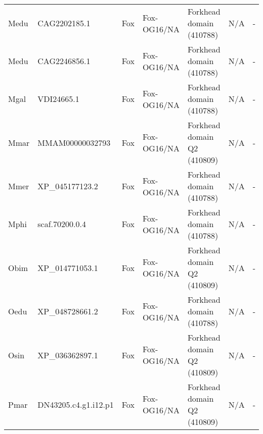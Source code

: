 \documentclass[../main.tex]{subfiles}
\begin{document}
\begin{landscape}
\begin{longtable}{lllllll}
		Medu           & CAG2202185.1          & Fox            & Fox-OG16/NA         & Forkhead domain (410788)                    & N/A                                                                    & -                    \\
		Medu           & CAG2246856.1          & Fox            & Fox-OG16/NA         & Forkhead domain (410788)                    & N/A                                                                    & -                    \\
		Mgal           & VDI24665.1            & Fox            & Fox-OG16/NA         & Forkhead domain (410788)                    & N/A                                                                    & -                    \\
		Mmar           & MMAM00000032793       & Fox            & Fox-OG16/NA         & Forkhead domain Q2 (410809)                 & N/A                                                                    & -                    \\
		Mmer           & XP\_045177123.2       & Fox            & Fox-OG16/NA         & Forkhead domain (410788)                    & N/A                                                                    & -                    \\
		Mphi           & scaf.70200.0.4        & Fox            & Fox-OG16/NA         & Forkhead domain (410788)                    & N/A                                                                    & -                    \\
		Obim           & XP\_014771053.1       & Fox            & Fox-OG16/NA         & Forkhead domain Q2 (410809)                 & N/A                                                                    & -                    \\
		Oedu           & XP\_048728661.2       & Fox            & Fox-OG16/NA         & Forkhead domain (410788)                    & N/A                                                                    & -                    \\
		Osin           & XP\_036362897.1       & Fox            & Fox-OG16/NA         & Forkhead domain Q2 (410809)                 & N/A                                                                    & -                    \\
		Pmar           & DN43205.c4.g1.i12.p1  & Fox            & Fox-OG16/NA         & Forkhead domain Q2 (410809)                 & N/A                                                                    & -                    \\

\end{longtable}
\end{landscape}
\end{document}
